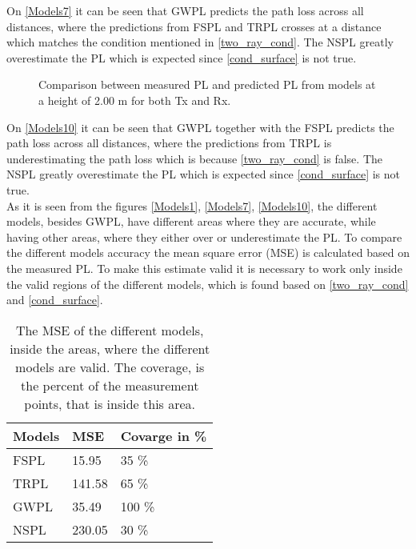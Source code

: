 On \autoref{Models7} it can be seen that GWPL predicts the path loss across all distances, where the predictions from FSPL and TRPL crosses at a distance which matches the condition mentioned in \eqref{two_ray_cond}. The NSPL greatly overestimate the PL which is expected since \eqref{cond_surface} is not true.

\begin{figure}[H]
\centering

\caption{Comparison between measured PL and predicted PL from models at a height of 2.00 m for both Tx and Rx.}
\label{Models10}
\end{figure}

On \autoref{Models10} it can be seen that GWPL together with the FSPL predicts the path loss across all distances, where the predictions from TRPL is underestimating the path loss which is because \eqref{two_ray_cond} is false. The NSPL greatly overestimate the PL which is expected since \eqref{cond_surface} is not true.\\



As it is seen from the figures \autoref{Models1}, \autoref{Models7}, \autoref{Models10}, the different models, besides GWPL, have different areas where they are accurate, while having other areas, where they either over or underestimate the PL. To compare the different models accuracy the mean square error (MSE) is calculated based on the measured PL. To make this estimate valid it is necessary to work only inside the valid regions of the different models, which is found based on \eqref{two_ray_cond} and \eqref{cond_surface}. 




\begin{table}[!htbp]
\centering
\begin{tabular}{|l|l|l|}
\hline
\textbf{Models} & \textbf{MSE} & \textbf{Covarge in \%} \\ \hline
FSPL            & 15.95        & 35 \%                  \\ \hline
TRPL 		    & 141.58       & 65 \%                  \\ \hline %
GWPL            & 35.49        & 100 \%                 \\ \hline
NSPL            & 230.05       & 30 \%                  \\ \hline
\end{tabular}
\caption{The MSE of the different models, inside the areas, where the different models are valid. The coverage, is the percent of the measurement points, that is inside this area.}
\label{model_comparison}
\end{table}





